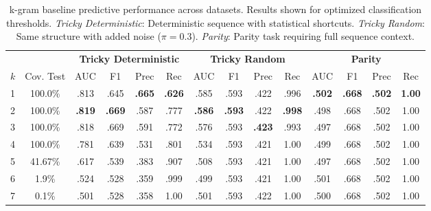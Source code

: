 \documentclass{article}
\theoremstyle{plain}
\theoremstyle{definition}
\theoremstyle{remark}
\begin{document}
\begin{table}[h!]
\centering
\caption{k-gram baseline predictive performance across datasets. Results shown for optimized classification thresholds. \textit{Tricky Deterministic}: Deterministic sequence with statistical shortcuts. \textit{Tricky Random}: Same structure with added noise ($\pi=0.3$). \textit{Parity}: Parity task requiring full sequence context.}
\label{tab:ngram_appendix}
\small
\begin{tabular}{lccccc|cccc|cccc}
\toprule
&&   \multicolumn{4}{c}{\textbf{Tricky Deterministic}} & \multicolumn{4}{c}{\textbf{Tricky Random}} & \multicolumn{4}{c}{\textbf{Parity}} \\
\cmidrule(lr){3-6} \cmidrule(lr){7-10} \cmidrule(lr){11-14}
$k$ & Cov. Test  & AUC & F1 & Prec & Rec & AUC & F1 & Prec & Rec & AUC & F1 & Prec & Rec \\
\midrule
1 & 100.0\% & .813 & .645 & \textbf{.665} & \textbf{.626} & .585 & .593 & .422 & .996 & \textbf{.502} & \textbf{.668} & \textbf{.502} & \textbf{1.00} \\
2 & 100.0\% &\textbf{.819} & \textbf{.669} & .587 & .777 & \textbf{.586} & \textbf{.593} & .422 & \textbf{.998} & .498 & .668 & .502 & 1.00 \\
3 & 100.0\%  &.818 & .669 & .591 & .772 & .576 & .593 & \textbf{.423} & .993 & .497 & .668 & .502 & 1.00 \\
4 & 100.0\%  &.781 & .639 & .531 & .801 & .534 & .593 & .421 & 1.00 & .499 & .668 & .502 & 1.00 \\
5 & 41.67\% &.617 & .539 & .383 & .907 & .508 & .593 & .421 & 1.00 & .497 & .668 & .502 & 1.00 \\
6 & 1.9\% &.524 & .528 & .359 & .999 & .499 & .593 & .421 & 1.00 & .501 & .668 & .502 & 1.00 \\
7 & 0.1\% &.501 & .528 & .358 & 1.00 & .501 & .593 & .422 & 1.00 & .500 & .668 & .502 & 1.00 \\
\bottomrule
\end{tabular}
\end{table}
\end{document}
